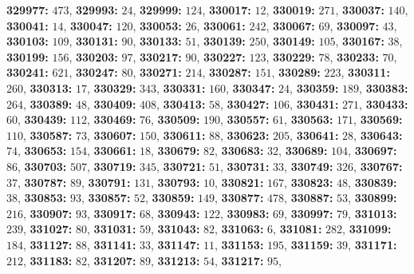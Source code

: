 \textsf{\bfseries 329977:} $473$, \textsf{\bfseries 329993:} $24$, \textsf{\bfseries 329999:} $124$, \textsf{\bfseries 330017:} $12$, \textsf{\bfseries 330019:} $271$, \textsf{\bfseries 330037:} $140$, \textsf{\bfseries 330041:} $14$, \textsf{\bfseries 330047:} $120$, \textsf{\bfseries 330053:} $26$, \textsf{\bfseries 330061:} $242$, \textsf{\bfseries 330067:} $69$, \textsf{\bfseries 330097:} $43$, \textsf{\bfseries 330103:} $109$, \textsf{\bfseries 330131:} $90$, \textsf{\bfseries 330133:} $51$, \textsf{\bfseries 330139:} $250$, \textsf{\bfseries 330149:} $105$, \textsf{\bfseries 330167:} $38$, \textsf{\bfseries 330199:} $156$, \textsf{\bfseries 330203:} $97$, \textsf{\bfseries 330217:} $90$, \textsf{\bfseries 330227:} $123$, \textsf{\bfseries 330229:} $78$, \textsf{\bfseries 330233:} $70$, \textsf{\bfseries 330241:} $621$, \textsf{\bfseries 330247:} $80$, \textsf{\bfseries 330271:} $214$, \textsf{\bfseries 330287:} $151$, \textsf{\bfseries 330289:} $223$, \textsf{\bfseries 330311:} $260$, \textsf{\bfseries 330313:} $17$, \textsf{\bfseries 330329:} $343$, \textsf{\bfseries 330331:} $160$, \textsf{\bfseries 330347:} $24$, \textsf{\bfseries 330359:} $189$, \textsf{\bfseries 330383:} $264$, \textsf{\bfseries 330389:} $48$, \textsf{\bfseries 330409:} $408$, \textsf{\bfseries 330413:} $58$, \textsf{\bfseries 330427:} $106$, \textsf{\bfseries 330431:} $271$, \textsf{\bfseries 330433:} $60$, \textsf{\bfseries 330439:} $112$, \textsf{\bfseries 330469:} $76$, \textsf{\bfseries 330509:} $190$, \textsf{\bfseries 330557:} $61$, \textsf{\bfseries 330563:} $171$, \textsf{\bfseries 330569:} $110$, \textsf{\bfseries 330587:} $73$, \textsf{\bfseries 330607:} $150$, \textsf{\bfseries 330611:} $88$, \textsf{\bfseries 330623:} $205$, \textsf{\bfseries 330641:} $28$, \textsf{\bfseries 330643:} $74$, \textsf{\bfseries 330653:} $154$, \textsf{\bfseries 330661:} $18$, \textsf{\bfseries 330679:} $82$, \textsf{\bfseries 330683:} $32$, \textsf{\bfseries 330689:} $104$, \textsf{\bfseries 330697:} $86$, \textsf{\bfseries 330703:} $507$, \textsf{\bfseries 330719:} $345$, \textsf{\bfseries 330721:} $51$, \textsf{\bfseries 330731:} $33$, \textsf{\bfseries 330749:} $326$, \textsf{\bfseries 330767:} $37$, \textsf{\bfseries 330787:} $89$, \textsf{\bfseries 330791:} $131$, \textsf{\bfseries 330793:} $10$, \textsf{\bfseries 330821:} $167$, \textsf{\bfseries 330823:} $48$, \textsf{\bfseries 330839:} $38$, \textsf{\bfseries 330853:} $93$, \textsf{\bfseries 330857:} $52$, \textsf{\bfseries 330859:} $149$, \textsf{\bfseries 330877:} $478$, \textsf{\bfseries 330887:} $53$, \textsf{\bfseries 330899:} $216$, \textsf{\bfseries 330907:} $93$, \textsf{\bfseries 330917:} $68$, \textsf{\bfseries 330943:} $122$, \textsf{\bfseries 330983:} $69$, \textsf{\bfseries 330997:} $79$, \textsf{\bfseries 331013:} $239$, \textsf{\bfseries 331027:} $80$, \textsf{\bfseries 331031:} $59$, \textsf{\bfseries 331043:} $82$, \textsf{\bfseries 331063:} $6$, \textsf{\bfseries 331081:} $282$, \textsf{\bfseries 331099:} $184$, \textsf{\bfseries 331127:} $88$, \textsf{\bfseries 331141:} $33$, \textsf{\bfseries 331147:} $11$, \textsf{\bfseries 331153:} $195$, \textsf{\bfseries 331159:} $39$, \textsf{\bfseries 331171:} $212$, \textsf{\bfseries 331183:} $82$, \textsf{\bfseries 331207:} $89$, \textsf{\bfseries 331213:} $54$, \textsf{\bfseries 331217:} $95$, 
